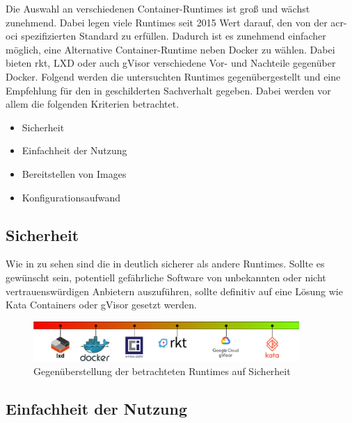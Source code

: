Die Auswahl an verschiedenen Container-Runtimes ist groß und wächst zunehmend. Dabei legen viele Runtimes seit 2015 Wert darauf, den von der \gls{acr-oci} spezifizierten Standard zu erfüllen. Dadurch ist es zunehmend einfacher möglich, eine Alternative Container-Runtime neben Docker zu wählen. Dabei bieten rkt, LXD oder auch gVisor verschiedene Vor- und Nachteile gegenüber Docker. Folgend werden die untersuchten Runtimes gegenübergestellt und eine Empfehlung für den in  geschilderten Sachverhalt gegeben. Dabei werden vor allem die folgenden Kriterien betrachtet.
\begin{itemize}
	\item Sicherheit
	\item Einfachheit der Nutzung
	\item Bereitstellen von Images
	\item Konfigurationsaufwand
\end{itemize}

\subsection{Sicherheit}
\label{sec:compFazitSec}


Wie in  zu sehen sind die in  deutlich sicherer als andere Runtimes. Sollte es gewünscht sein, potentiell gefährliche Software von unbekannten oder nicht vertrauenswürdigen Anbietern auszuführen, sollte definitiv auf eine Lösung wie Kata Containers oder gVisor gesetzt werden.

\begin{figure}[h]
	\begin{center}
		\includegraphics[width=0.9\textwidth]{bilder/rating-sec.pdf}
		\caption{Gegenüberstellung der betrachteten Runtimes auf Sicherheit}
		\label{fig:compFazitSec}
	\end{center}
\end{figure}

\subsection{Einfachheit der Nutzung}
\label{sec:compFazitEoU}

